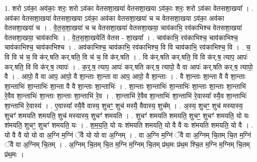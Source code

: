 \documentclass[17pt]{extarticle}
\begin{document}
1. शरो ऽव॑का॒ अव॑काः॒ शरः॒ शरो ऽव॑का वेतसशा॒खया॑ वेतसशा॒खया ऽव॑काः॒ शरः॒ शरो ऽव॑का वेतसशा॒खया᳚ । . अव॑का वेतसशा॒खया॑ वेतसशा॒खया ऽव॑का॒ अव॑का वेतसशा॒खया॑ च च वेतसशा॒खया ऽव॑का॒ अव॑का वेतसशा॒खया॑ च । . वे॒त॒स॒शा॒खया॑ च च वेतसशा॒खया॑ वेतसशा॒खया॒ चाव॑काभि॒ रव॑काभिश्च वेतसशा॒खया॑ वेतसशा॒खया॒ चाव॑काभिः । . वे॒त॒स॒शा॒खयेति॑ वेतस - शा॒खया᳚ । . चाव॑काभि॒ रव॑काभिश्च॒ चाव॑काभिश्च॒ चाव॑काभिश्च॒ चाव॑काभिश्च । . अव॑काभिश्च॒ चाव॑काभि॒ रव॑काभिश्च॒ वि वि चाव॑काभि॒ रव॑काभिश्च॒ वि । . च॒ वि वि च॑ च॒ वि क॑र्.षति कर्.षति॒ वि च॑ च॒ वि क॑र्.षति । . वि क॑र्.षति कर्.षति॒ वि वि क॑र्.ष॒ त्याप॒ आपः॑ कर्.षति॒ वि वि क॑र्.ष॒ त्यापः॑ । . क॒र्॒.ष॒ त्याप॒ आपः॑ कर्.षति कर्.ष॒ त्यापो॒ वै वा आपः॑ कर्.षति कर्.ष॒ त्यापो॒ वै । . आपो॒ वै वा आप॒ आपो॒ वै शा॒न्ताः शा॒न्ता वा आप॒ आपो॒ वै शा॒न्ताः । . वै शा॒न्ताः शा॒न्ता वै वै शा॒न्ताः शा॒न्ताभिः॑ शा॒न्ताभिः॑ शा॒न्ता वै वै शा॒न्ताः शा॒न्ताभिः॑ । . शा॒न्ताः शा॒न्ताभिः॑ शा॒न्ताभिः॑ शा॒न्ताः शा॒न्ताः शा॒न्ताभि॑ रे॒वैव शा॒न्ताभिः॑ शा॒न्ताः शा॒न्ताः शा॒न्ताभि॑ रे॒व । . शा॒न्ताभि॑ रे॒वैव शा॒न्ताभिः॑ शा॒न्ताभि॑ रे॒वास्या᳚ स्यै॒व शा॒न्ताभिः॑ शा॒न्ताभि॑ रे॒वास्य॑ । . ए॒वास्या᳚ स्यै॒वै वास्य॒ शुचꣳ॒॒ शुच॑ मस्यै॒ वैवास्य॒ शुच᳚म् । . अ॒स्य॒ शुचꣳ॒॒ शुच॑ मस्यास्य॒ शुचꣳ॑ शमयति शमयति॒ शुच॑ मस्यास्य॒ शुचꣳ॑ शमयति । . शुचꣳ॑ शमयति शमयति॒ शुचꣳ॒॒ शुचꣳ॑ शमयति॒ यो यः श॑मयति॒ शुचꣳ॒॒ शुचꣳ॑ शमयति॒ यः । . श॒म॒य॒ति॒ यो यः श॑मयति शमयति॒ यो वै वै यः श॑मयति शमयति॒ यो वै । . यो वै वै यो यो वा अ॒ग्नि म॒ग्निं ॅवै यो यो वा अ॒ग्निम् । . वा अ॒ग्नि म॒ग्निं ॅवै वा अ॒ग्निम् चि॒तम् चि॒त म॒ग्निं ॅवै वा अ॒ग्निम् चि॒तम् । . अ॒ग्निम् चि॒तम् चि॒त म॒ग्नि म॒ग्निम् चि॒तम् प्र॑थ॒मः प्र॑थ॒म श्चि॒त म॒ग्नि म॒ग्निम् चि॒तम् प्र॑थ॒मः । \newline
\end{document}
